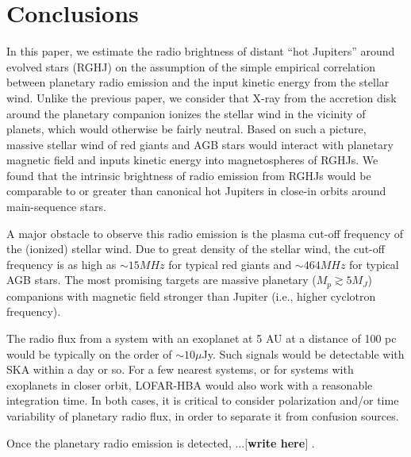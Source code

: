 \documentclass[iop,numberedappendix,apj]{emulateapj}
\def\memoYF#1{\color{red}$[${\bf #1}$]$ \color{black}}
\begin{document}


\section{Conclusions}
\label{sec:conc}

In this paper, we estimate the radio brightness of distant ``hot Jupiters'' around evolved stars (RGHJ) on the assumption of the simple empirical correlation between planetary radio emission and the input kinetic energy from the stellar wind. 
Unlike the previous paper, we consider that X-ray from the accretion disk around the planetary companion ionizes the stellar wind in the vicinity of planets, which would otherwise be fairly neutral. 
Based on such a picture, massive stellar wind of red giants and AGB stars would interact with planetary magnetic field and inputs kinetic energy into magnetospheres of RGHJs. 
We found that the intrinsic brightness of radio emission from RGHJs would be comparable to or greater than canonical hot Jupiters in close-in orbits around main-sequence stars. 

A major obstacle to observe this radio emission is the plasma cut-off frequency of the (ionized) stellar wind. Due to great density of the stellar wind, the cut-off frequency is as high as $\sim 15 MHz$ for typical red giants and $\sim 464 MHz$ for typical AGB stars. 
The most promising targets are massive planetary ($M_p \gtrsim 5M_J$) companions with magnetic field stronger than Jupiter (i.e., higher cyclotron frequency). 

The radio flux from a system with an exoplanet at 5 AU at a distance of 100 pc would be typically on the order of $\sim 10 \mu $Jy. 
Such signals would be detectable with SKA within a day or so. 
For a few nearest systems, or for systems with exoplanets in closer orbit, LOFAR-HBA  would also work with a reasonable integration time. 
In both cases, it is critical to consider polarization and/or time variability of planetary radio flux, in order to separate it from confusion sources. 

Once the planetary radio emission is detected, ...\memoYF{write here}. 
\end{document}
